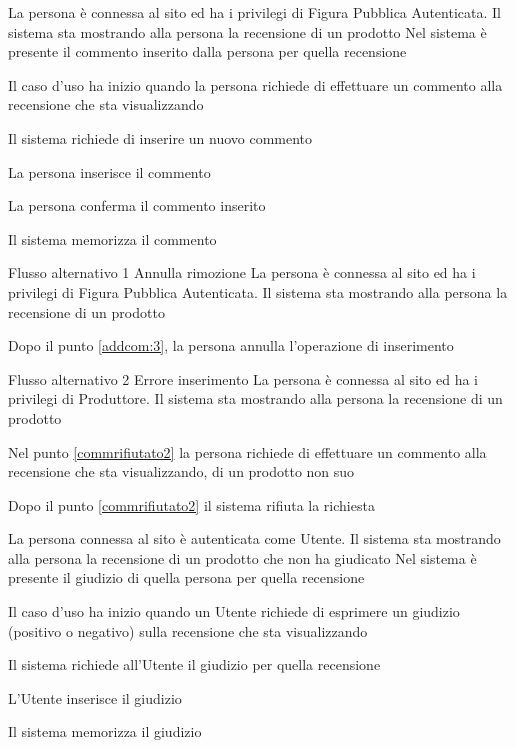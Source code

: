 
{}
{La persona è connessa al sito ed ha i privilegi di Figura Pubblica Autenticata. Il sistema sta mostrando alla persona la recensione di un prodotto}
{Nel sistema è presente il commento inserito dalla persona per quella recensione}
{\begin{enumCU}
	\item Il caso d'uso ha inizio quando la persona richiede di effettuare un commento alla recensione che sta visualizzando\label{commrifiutato2}
	\item Il sistema richiede di inserire un nuovo commento 
	\item La persona inserisce il commento\label{addcom:3}
	\item La persona conferma il commento inserito
	\item Il sistema memorizza il commento
\end{enumCU}}
%
{Flusso alternativo 1}%
{Annulla rimozione}%
{La persona è connessa al sito ed ha i privilegi di Figura Pubblica Autenticata. Il sistema sta mostrando alla persona la recensione di un prodotto}
{\postNulle}%
{\begin{enumCU}
		\item Dopo il punto \ref{addcom:3}, la persona annulla l'operazione di inserimento
	\end{enumCU}}%
%
{Flusso alternativo 2}%
{Errore inserimento}%
{La persona è connessa al sito ed ha i privilegi di Produttore. Il sistema sta mostrando alla persona la recensione di un prodotto}
{\postNulle}%
{\begin{enumCU}
		\item Nel punto \ref{commrifiutato2} la persona richiede di effettuare un commento alla recensione che sta visualizzando, di un prodotto non suo
		\item Dopo il punto \ref{commrifiutato2} il sistema rifiuta la richiesta
	\end{enumCU}}%


{}
{La persona connessa al sito è autenticata come Utente. Il sistema sta mostrando alla persona la recensione di un prodotto che non ha giudicato}
{Nel sistema è presente il giudizio di quella persona per quella recensione}
{\begin{enumCU}
	\item Il caso d'uso ha inizio quando un Utente richiede di esprimere un giudizio (positivo o negativo) sulla recensione che sta visualizzando
	\item Il sistema richiede all'Utente il giudizio per quella recensione
	\item L'Utente inserisce il giudizio
	\item Il sistema memorizza il giudizio
\end{enumCU}}


